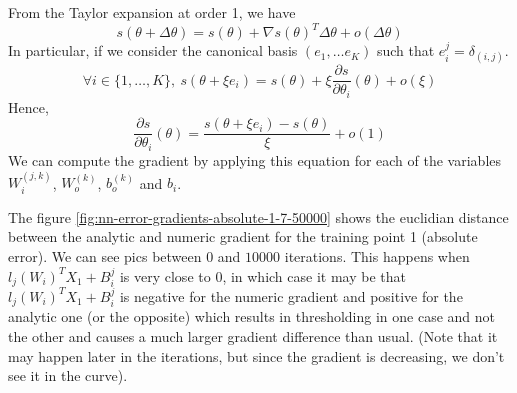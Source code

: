 \documentclass{article}
\newcommand{\pd}[2]{\frac{\partial #1}{\partial #2}}
\begin{document}

From the Taylor expansion at order 1, we have
\begin{equation*}
  s(\theta + \Delta\theta) = s(\theta) + \nabla{s}(\theta)^T \Delta\theta + o(\Delta\theta)
\end{equation*}
In particular, if we consider the canonical basis $(e_1, \dots e_K)$
such that $e_i^{j} = \delta_{(i, j)}$.
\begin{equation*}
  \forall i \in \{1, \dots, K\},\ s(\theta + \xi e_i) =
  s(\theta) + \xi \pd{s}{\theta_i}(\theta) + o(\xi)
\end{equation*}
Hence,
\begin{equation*}
  \pd{s}{\theta_i}(\theta) =
  \dfrac{s(\theta + \xi e_i) - s(\theta)}{\xi} + o(1)
\end{equation*}
We can compute the gradient by applying this equation for each of the
variables $W_i^{(j, k)}$, $W_o^{(k)}$, $b_o^{(k)}$ and $b_i$.


The figure \ref{fig:nn-error-gradients-absolute-1-7-50000} shows the
euclidian distance between the analytic and numeric gradient for the
training point 1 (absolute error). We can see pics between $0$ and
$10000$ iterations. This happens when $l_j(W_i)^T X_1 + B_i^j$ is very
close to $0$, in which case it may be that $l_j(W_i)^T X_1 + B_i^j$ is
negative for the numeric gradient and positive for the analytic one
(or the opposite) which results in thresholding in one case and not
the other and causes a much larger gradient difference than usual.
(Note that it may happen later in the iterations, but since the
gradient is decreasing, we don't see it in the curve).
\end{document}
